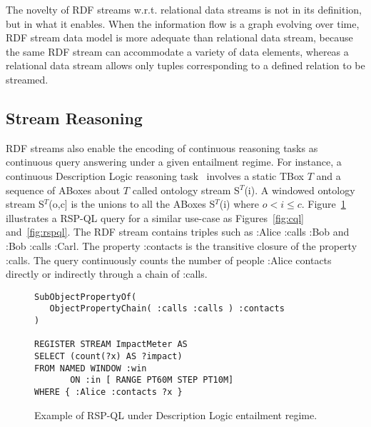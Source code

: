 The novelty of RDF streams w.r.t. relational data streams is not in its definition, but in what it enables. When the information flow is a graph evolving over time, RDF stream data model is more adequate than relational data stream, because the same RDF stream can accommodate a variety of data elements, whereas a relational data stream allows only tuples corresponding to a defined relation to be streamed. 

\subsection{Stream Reasoning}\label{sec:rdf} %

RDF streams also enable the encoding of continuous reasoning tasks as continuous query answering under a given entailment regime. For instance, a continuous Description Logic reasoning task~\cite{Walavalkar2008} involves 
a static TBox $T$ and a sequence of ABoxes about $T$ called
ontology stream S$^T$(i).
A windowed ontology stream S$^T$(o,c] is the unions to all the ABoxes
S$^T$(i) where $o<i\leq c$.
Figure~\ref{fig:sr} illustrates a RSP-QL query for a similar use-case as Figures~\ref{fig:cql} and~\ref{fig:rspql}. The RDF stream contains triples such as \textsf{:Alice :calls :Bob} and \textsf{:Bob :calls :Carl}. The property \textsf{:contacts} is the transitive closure of the property \textsf{:calls}. The query continuously counts the number of people \textsf{:Alice} contacts directly or indirectly through a chain of \textsf{:calls}.

\begin{figure}[!h]
\begin{lstlisting}[language=rsp-ql]
SubObjectPropertyOf( 
   ObjectPropertyChain( :calls :calls ) :contacts 
)

REGISTER STREAM ImpactMeter AS
SELECT (count(?x) AS ?impact)
FROM NAMED WINDOW :win 
       ON :in [ RANGE PT60M STEP PT10M]
WHERE { :Alice :contacts ?x }
\end{lstlisting}
\vspace*{-4mm}
\caption{\label{fig:sr}Example of RSP-QL under Description Logic entailment regime.}
\end{figure}

